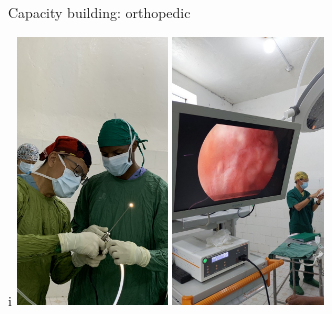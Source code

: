 \documentclass[aspectratio=169]{beamer}
\begin{document}
\begin{frame}{Capacity building: orthopedic}
    \begin{center}i
        \includegraphics[width=0.30\textwidth]{IMG-6067.jpg}
        \includegraphics[width=0.30\textwidth]{IMG-6227.JPG}
    \end{center}
\end{frame}
\end{document}

